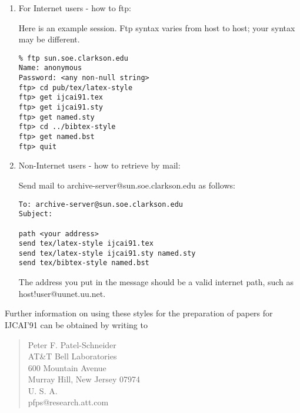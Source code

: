 \begin{enumerate} 
\item For Internet users - how to ftp:

Here is an example session.  Ftp syntax varies from host to
host; your syntax may be different.

\begin{verbatim}
% ftp sun.soe.clarkson.edu
Name: anonymous
Password: <any non-null string>
ftp> cd pub/tex/latex-style
ftp> get ijcai91.tex
ftp> get ijcai91.sty
ftp> get named.sty
ftp> cd ../bibtex-style
ftp> get named.bst
ftp> quit
\end{verbatim}

\item  Non-Internet users - how to retrieve by mail:

Send mail to
archive-server@sun.soe.clarkson.edu as follows:

\begin{verbatim}
To: archive-server@sun.soe.clarkson.edu
Subject:

path <your address>
send tex/latex-style ijcai91.tex
send tex/latex-style ijcai91.sty named.sty
send tex/bibtex-style named.bst
\end{verbatim}

The address you put in the message should be a valid internet path,
such as host!user@uunet.uu.net.

\end{enumerate}

Further information on using these styles for the preparation of papers for
IJCAI'91 can be obtained by writing to
\begin{quote}
Peter F. Patel-Schneider \\
AT\&T Bell Laboratories \\
600 Mountain Avenue\\
Murray Hill, New Jersey \hspace{1em} 07974 \\
U. S. A. \\
pfps@research.att.com
\end{quote}

